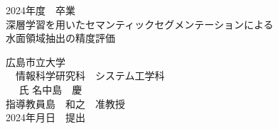 \renewcommand{\thepage}{}
\begin{center}

 
{\huge
\vspace*{4cm}
\LARGE{2024年度　卒業\\ }
}
\vspace{8mm}
{
 \LARGE{深層学習を用いたセマンティックセグメンテーションによる}\\\vspace{2mm}
 \LARGE{水面領域抽出の精度評価}
}

\end{center}


\vspace{4cm}

\begin{center}
{\Large
\noindent 広島市立大学\\
　情報科学研究科　システム工学科\\
\vspace{3em}
\noindent \hspace{-1.15em}氏  名\hspace{3em}中島　慶\\
\hspace{0.15em}指導教員\hspace{3em}島　和之　准教授\\

\vspace{2em}
2024年月日　提出\\

}\end{center}

\clearpage
